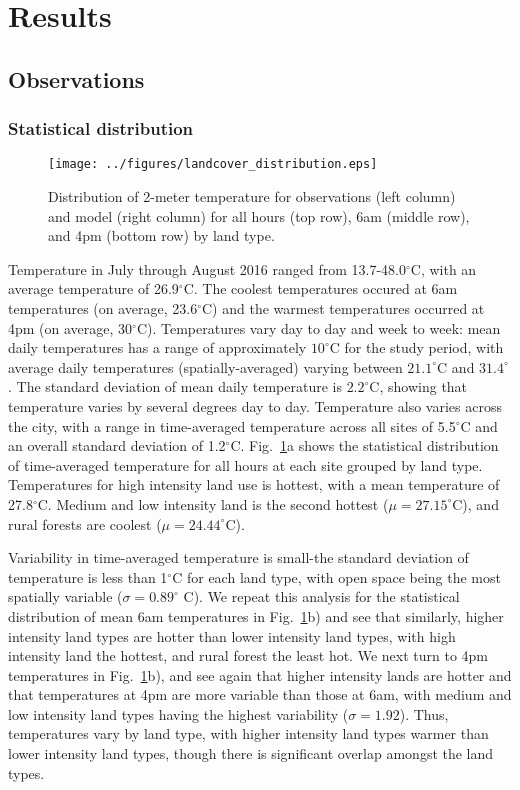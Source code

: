 \documentclass[draft,linenumbers]{agujournal}
\begin{document}
\section{Results}\label{sec:results} 
\subsection{Observations}
\subsubsection{Statistical distribution}

\begin{figure}
\centering
\texttt{[image: ../figures/landcover\_distribution.eps]}
\caption{Distribution of 2-meter temperature for observations (left column) and model (right column) for all hours (top row), 6am (middle row), and 4pm (bottom row) by land type. }
\label{fig:hist}
\end{figure}

Temperature in July through August 2016 ranged from 13.7-48.0$^\circ$C, with an average temperature of 26.9$^\circ$C. The coolest temperatures occured at 6am temperatures (on average, 23.6$^\circ$C) and the warmest temperatures occurred at 4pm (on average,  30$^\circ$C). 
Temperatures vary day to day and week to week: mean daily temperatures has a range of approximately $10^\circ$C for the study period, with average daily temperatures (spatially-averaged) varying between $21.1^\circ$C and $31.4^\circ$. The standard deviation of mean daily temperature is $2.2^\circ$C, showing that temperature varies by several degrees day to day. 
Temperature also varies across the city, with a range in time-averaged temperature across all sites of 5.5$^\circ$C and an overall standard deviation of 1.2$^\circ$C. Fig.~\ref{fig:hist}a shows the statistical distribution of time-averaged temperature for all hours at each site grouped by land type. 
Temperatures %
for high intensity land use is hottest, with a mean temperature of 27.8$^\circ$C. Medium and low intensity land is the second hottest ($\mu = 27.15^\circ$C), and rural forests are coolest ($\mu = 24.44^\circ$C). 

Variability in time-averaged temperature is small-the standard deviation of temperature is less than 1$^\circ$C for each land type, with open space being the most spatially variable ($\sigma = 0.89^\circ$ C). We repeat this analysis for the statistical distribution of mean 6am temperatures in Fig.~\ref{fig:hist}b) and see that similarly, higher intensity land types are hotter than lower intensity land types, with high intensity land the hottest, and rural forest the least hot. We next turn to 4pm temperatures in Fig.~\ref{fig:hist}b), and see again that higher intensity lands are hotter and that temperatures at 4pm are more variable than those at 6am, with medium and low intensity land types having the highest variability ($\sigma = 1.92$). 
Thus, temperatures vary by land type, with higher intensity land types  warmer than lower intensity land types, 
though there is significant overlap amongst the land types.
\end{document}
